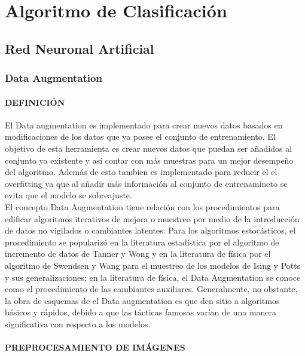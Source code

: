 \newpage
\chapter{Algoritmo de Clasificación}







	\section{Red Neuronal Artificial}

		\subsection{Data Augmentation}
			\subsubsection{DEFINICIÓN}

			El Data augmentation es implementado para crear nuevos datos basados en modificaciones de los datos que ya posee el conjunto de entrenamiento. El objetivo de esta herramienta es crear nuevos datos que puedan ser añadidos al conjunto ya existente y así contar con más muestras para un mejor desempeño del algoritmo. Además de esto tambien es implementado para reducir el el overfitting ya que al añadir más información al conjunto de entrenamineto se evita que el modelo se sobreajuste. \\


			El concepto Data Augmentation tiene relación con los procedimientos para edificar algoritmos iterativos de mejora o muestreo por medio de la introducción de datos no vigilados o cambiantes latentes. Para los algoritmos estocásticos, el procedimiento se popularizó en la literatura estadística por el algoritmo de incremento de datos de Tanner y Wong y en la literatura de física por el algoritmo de Swendsen y Wang para el muestreo de los modelos de Ising y Potts y sus generalizaciones; en la literatura de física, el Data Augmentation se conoce como el procedimiento de las cambiantes auxiliares. Generalmente, no obstante, la obra de esquemas de el Data augmentation es que den sitio a algoritmos básicos y rápidos, debido a que las tácticas famosas varían de una manera significativa con respecto a los modelos.\cite{van2001art}
					
			 
			
			\subsubsection{PREPROCESAMIENTO DE IMÁGENES}

